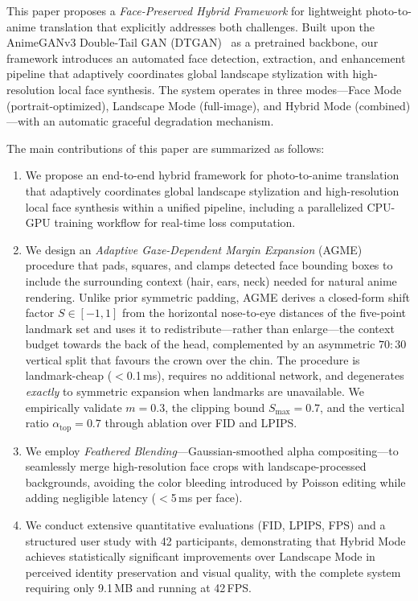 \documentclass[journal]{IEEEtran}
\begin{document}
This paper proposes a \textit{Face-Preserved Hybrid Framework} for lightweight photo-to-anime translation that explicitly addresses both challenges. Built upon the AnimeGANv3 Double-Tail GAN (DTGAN)~\cite{Liu2024} as a pretrained backbone, our framework introduces an automated face detection, extraction, and enhancement pipeline that adaptively coordinates global landscape stylization with high-resolution local face synthesis. The system operates in three modes---Face Mode (portrait-optimized), Landscape Mode (full-image), and Hybrid Mode (combined)---with an automatic graceful degradation mechanism.

The main contributions of this paper are summarized as follows:
\begin{enumerate}
\item We propose an end-to-end hybrid framework for photo-to-anime translation that adaptively coordinates global landscape stylization and high-resolution local face synthesis within a unified pipeline, including a parallelized CPU-GPU training workflow for real-time loss computation.

\item We design an \textit{Adaptive Gaze-Dependent Margin Expansion} (AGME) procedure that pads, squares, and clamps detected face bounding boxes to include the surrounding context (hair, ears, neck) needed for natural anime rendering. Unlike prior symmetric padding, AGME derives a closed-form shift factor $S \in [-1,1]$ from the horizontal nose-to-eye distances of the five-point landmark set and uses it to redistribute---rather than enlarge---the context budget towards the back of the head, complemented by an asymmetric $70{:}30$ vertical split that favours the crown over the chin. The procedure is landmark-cheap ($<$0.1\,ms), requires no additional network, and degenerates \textit{exactly} to symmetric expansion when landmarks are unavailable. We empirically validate $m = 0.3$, the clipping bound $S_{\max} = 0.7$, and the vertical ratio $\alpha_{\text{top}} = 0.7$ through ablation over FID and LPIPS.

\item We employ \textit{Feathered Blending}---Gaussian-smoothed alpha compositing---to seamlessly merge high-resolution face crops with landscape-processed backgrounds, avoiding the color bleeding introduced by Poisson editing while adding negligible latency ($<$5\,ms per face).

\item We conduct extensive quantitative evaluations (FID, LPIPS, FPS) and a structured user study with 42 participants, demonstrating that Hybrid Mode achieves statistically significant improvements over Landscape Mode in perceived identity preservation and visual quality, with the complete system requiring only 9.1\,MB and running at 42\,FPS.
\end{enumerate}
\end{document}
